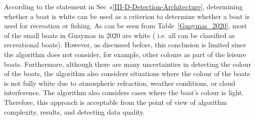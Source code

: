 According to the statement in Sec~s\ref{III-D-Detection-Architecture}, determining whether a boat is white can be used as a criterion to determine whether a boat is used for recreation or fishing. As can be seen from Table~\ref{Guaymas_2020}, most of the small boats in Guaymas in 2020 are white ( i.e. all can be classified as recreational boats). However, as discussed before, this conclusion is limited since the algorithm does not consider, for example, other colours as part of the leisure boats. Furthermore, although there are many uncertainties in detecting the colour of the boats, the algorithm also considers situations where the colour of the boats is not fully white due to atmospheric refraction, weather conditions, or cloud interference. The algorithm also considers cases where the boat's colour is light. Therefore, this approach is acceptable from the point of view of algorithm complexity, results, and detecting data quality.